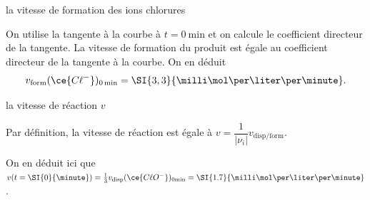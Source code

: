 
\begin{enonce}
la vitesse de formation des ions chlorures 
\end{enonce}


\begin{corrige}
On utilise la tangente à la courbe à $t=\SI{0}{\minute}$ et on calcule le coefficient directeur de la tangente. La vitesse de formation du produit est égale au coefficient directeur de la tangente à la courbe. On en déduit 
\[
v_\text{form}(\ce{C\ell^-})_\text{0\,min} = \SI{3,3}{\milli\mol\per\liter\per\minute}.
\]
\end{corrige}


\begin{enonce}
la vitesse de réaction $v$
\end{enonce}


\begin{corrige}
Par définition, la vitesse de réaction est égale à $v = \dfrac{1}{|\nu_i|} v_\text{disp/form}$. 

On en déduit ici que $v(t=\SI{0}{\minute}) = 
\frac{1}{3}v_\text{disp}(\ce{C\ell O^-})_\text{0min}=
\SI{1.7}{\milli\mol\per\liter\per\minute}$.
\end{corrige}



\finEntrainement


\newpage






